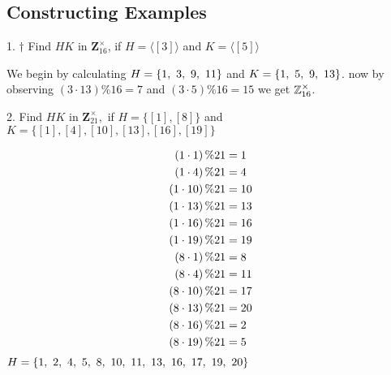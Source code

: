 \subsection{Constructing Examples}
\begin{mdframed}[style=darkQuesion]
  1. $\dagger$ Find $H K$ in $\mathbf{Z}_{16}^{\times}$, if $H=\langle[3]\rangle$ and $K=\langle[5]\rangle$
\end{mdframed}
\begin{mdframed}[style=darkAnswer,frametitle={Joe Starr}]
  We begin by calculating $H=\left\{1,\ 3,\ 9,\ 11\right\}$ and $K=\left\{1,\ 5,\ 9,\ 13\right\}$. 
  now by observing $(3\cdot13)\%16=7$ and $(3\cdot5)\%16=15$ we get $\mathbb{Z}_{16}^\times$.
\end{mdframed}
\newpage
\begin{mdframed}[style=darkQuesion]
  2. Find $H K$ in $\mathbf{Z}_{21}^{\times},$ if $H=\{[1],[8]\}$ and $K=\{[1],[4],[10],[13],[16],[19]\}$
\end{mdframed}
\begin{mdframed}[style=darkAnswer,frametitle={Joe Starr}]
  \begin{align*}
    \left(1\cdot1 \right)\% 21 &=1\\
\left(1\cdot4 \right)\% 21 &=4\\
\left(1\cdot10\right)\% 21 &= 10\\
\left(1\cdot13\right)\% 21 &= 13\\
\left(1\cdot16\right)\% 21 &= 16\\
\left(1\cdot19\right)\% 21 &= 19\\
\left(8\cdot1 \right)\% 21 &=8\\
\left(8\cdot4 \right)\% 21 &=11\\
\left(8\cdot10\right)\% 21 &= 17\\
\left(8\cdot13\right)\% 21 &= 20\\
\left(8\cdot16\right)\% 21 &= 2\\
\left(8\cdot19\right)\% 21 &= 5
  \end{align*}
  $H=\left\{1,\ 2,\ 4,\ 5,\ 8,\ 10,\ 11,\ 13,\ 16,\ 17,\ 19,\ 20\right\}$
\end{mdframed}
